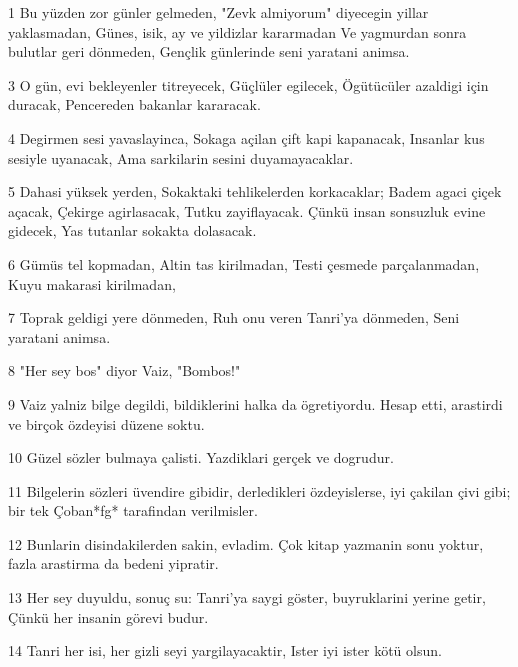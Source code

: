 \par 1 Bu yüzden zor günler gelmeden, "Zevk almiyorum" diyecegin yillar yaklasmadan, Günes, isik, ay ve yildizlar kararmadan Ve yagmurdan sonra bulutlar geri dönmeden, Gençlik günlerinde seni yaratani animsa.
\par 3 O gün, evi bekleyenler titreyecek, Güçlüler egilecek, Ögütücüler azaldigi için duracak, Pencereden bakanlar kararacak.
\par 4 Degirmen sesi yavaslayinca, Sokaga açilan çift kapi kapanacak, Insanlar kus sesiyle uyanacak, Ama sarkilarin sesini duyamayacaklar.
\par 5 Dahasi yüksek yerden, Sokaktaki tehlikelerden korkacaklar; Badem agaci çiçek açacak, Çekirge agirlasacak, Tutku zayiflayacak. Çünkü insan sonsuzluk evine gidecek, Yas tutanlar sokakta dolasacak.
\par 6 Gümüs tel kopmadan, Altin tas kirilmadan, Testi çesmede parçalanmadan, Kuyu makarasi kirilmadan,
\par 7 Toprak geldigi yere dönmeden, Ruh onu veren Tanri'ya dönmeden, Seni yaratani animsa.
\par 8 "Her sey bos" diyor Vaiz, "Bombos!"
\par 9 Vaiz yalniz bilge degildi, bildiklerini halka da ögretiyordu. Hesap etti, arastirdi ve birçok özdeyisi düzene soktu.
\par 10 Güzel sözler bulmaya çalisti. Yazdiklari gerçek ve dogrudur.
\par 11 Bilgelerin sözleri üvendire gibidir, derledikleri özdeyislerse, iyi çakilan çivi gibi; bir tek Çoban*fg* tarafindan verilmisler.
\par 12 Bunlarin disindakilerden sakin, evladim. Çok kitap yazmanin sonu yoktur, fazla arastirma da bedeni yipratir.
\par 13 Her sey duyuldu, sonuç su: Tanri'ya saygi göster, buyruklarini yerine getir, Çünkü her insanin görevi budur.
\par 14 Tanri her isi, her gizli seyi yargilayacaktir, Ister iyi ister kötü olsun.


